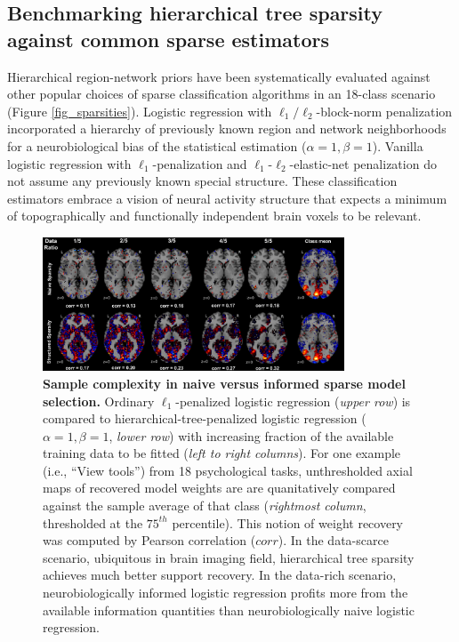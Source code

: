 \documentclass[runningheads,a4paper]{llncs}
\begin{document}
\subsection{Benchmarking hierarchical tree sparsity against
common sparse estimators}
Hierarchical region-network priors have been systematically
evaluated against other popular choices of sparse classification algorithms
in an 18-class scenario
(Figure \ref{fig_sparsities}).
%
Logistic regression with $\ell_1/\ell_2$-block-norm penalization
incorporated a hierarchy of previously known region and network neighborhoods
for a neurobiological bias of the statistical estimation
($\alpha = 1, \beta = 1$).
%
Vanilla logistic regression with $\ell_1$-penalization and
$\ell_1$-$\ell_2$-elastic-net penalization
do not assume any previously known special structure.
These classification estimators embrace a vision of neural activity structure
that expects a minimum of
topographically and functionally independent brain voxels to be relevant.
%
\begin{figure}
  \vspace{-0.3cm}
  \begin{centering}
    \includegraphics[width=0.80\textwidth]{../figures/dataratio_trans.pdf}
    \vspace{-0.3cm}
    \caption{\textbf{Sample complexity in naive versus informed sparse model selection.}
    Ordinary $\ell_1$-penalized logistic regression
    (\textit{upper row})
    is compared
    to hierarchical-tree-penalized logistic regression
    ($\alpha = 1, \beta = 1$, \textit{lower row})
    with increasing fraction
    of the available training data
    to be fitted (\textit{left to right columns}).
    For one example (i.e., ``View tools'') from 18 psychological tasks,
    unthresholded axial maps of recovered model weights
    are are quanitatively compared against
    the sample average of that class
    (\textit{rightmost column}, thresholded at the $75^{th}$ percentile).
    This notion of weight recovery was computed by
    Pearson correlation ($corr$).
    In the data-scarce scenario,
    ubiquitous in brain imaging field,
    hierarchical tree sparsity achieves much
    better support recovery.
    In the data-rich scenario,
    neurobiologically informed logistic regression
    profits more from the available information quantities than
    neurobiologically naive logistic regression.
    }
    \label{fig_dataratio}
    \vspace{-0.6cm}
  \end{centering}
\end{figure}
\end{document}
